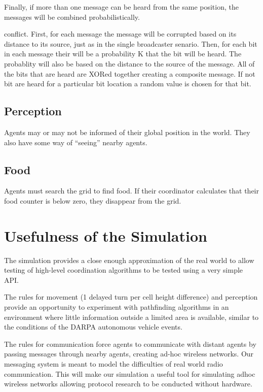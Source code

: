 Finally, if more than one message can be heard from the same position, the messages will be combined
probabilistically.

conflict. First, for each message the message will be corrupted based on its distance to its source,
just as in the single broadcaster senario. Then, for each bit in each message their will be a
probability K that the bit will be heard. The probablity will also be based on the distance to the
source of the message. All of the bits that are heard are XORed together creating a composite
message. If not bit are heard for a particular bit location a random value is chosen for that bit.

\subsection{Perception}

Agents may or may not be informed of their global position in the world. They also have some way of
``seeing'' nearby agents.

\subsection{Food}

Agents must search the grid to find food. If their coordinator calculates that their food counter is
below zero, they disappear from the grid.

\section{Usefulness of the Simulation}

The simulation provides a close enough approximation of the real world to allow testing of
high-level coordination algorithms to be tested using a very simple API.

The rules for movement (1 delayed turn per cell height difference) and perception provide an
opportunity to experiment with pathfinding algorithms in an environment where little information
outside a limited area is available, similar to the conditions of the DARPA autonomous vehicle
events.

The rules for communication force agents to communicate with distant agents by passing messages
through nearby agents, creating ad-hoc wireless networks. Our messaging system is meant to model the
difficulties of real world radio communication. This will make our simulation a useful tool for
simulating adhoc wireless networks allowing protocol research to be conducted without hardware.
